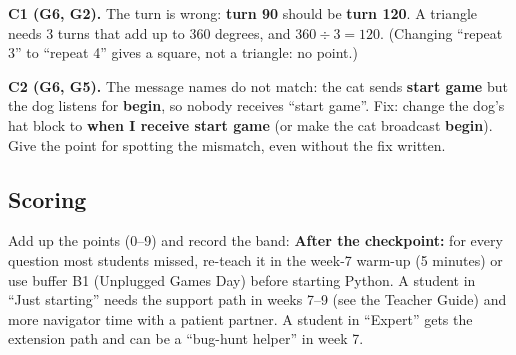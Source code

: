 \begin{answer}
\textbf{C1 (G6, G2).} The turn is wrong: \textbf{turn 90} should be \textbf{turn 120}. A triangle needs 3 turns that add up
to 360 degrees, and $360 \div 3 = 120$. (Changing \enquote{repeat 3} to \enquote{repeat 4} gives a square, not a triangle: no point.)

\textbf{C2 (G6, G5).} The message names do not match: the cat sends \textbf{start game} but the dog listens for
\textbf{begin}, so nobody receives \enquote{start game}. Fix: change the dog's hat block to \textbf{when I receive start game}
(or make the cat broadcast \textbf{begin}). Give the point for spotting the mismatch, even without the fix written.
\end{answer}

\subsection{Scoring}
Add up the points (0--9) and record the band:
\textbf{After the checkpoint:} for every question most students missed, re-teach it in the week-7 warm-up
(5 minutes) or use buffer B1 (Unplugged Games Day) before starting Python. A student in \enquote{Just starting}
needs the support path in weeks 7--9 (see the Teacher Guide) and more navigator time with a patient partner.
A student in \enquote{Expert} gets the extension path and can be a \enquote{bug-hunt helper} in week 7.

